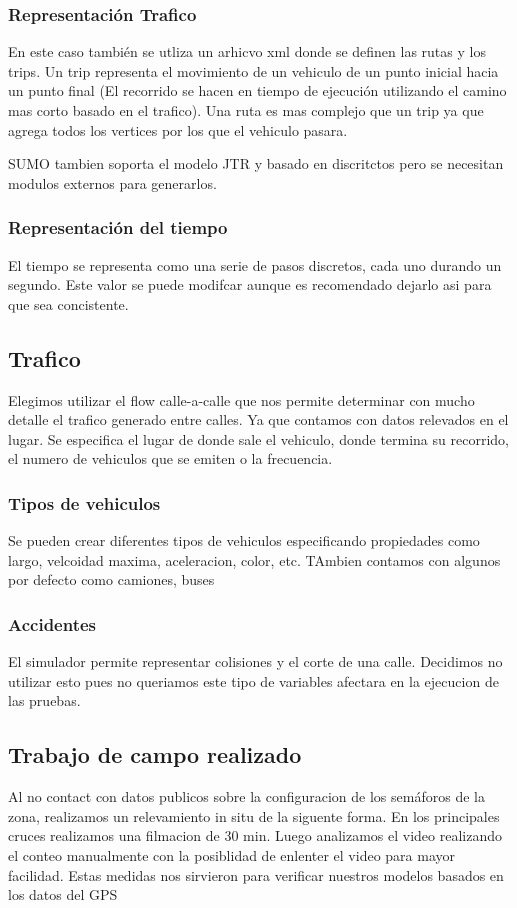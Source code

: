 \subsubsection{Representación Trafico}
En este caso también se utliza un arhicvo xml donde se definen las rutas y los trips. Un trip representa el movimiento de un vehiculo de un punto inicial hacia un punto final (El recorrido se hacen en tiempo de ejecución utilizando el camino mas corto basado en el trafico). Una ruta es mas complejo que un trip ya que agrega todos los vertices por los que el vehiculo pasara.

SUMO tambien soporta el modelo JTR y basado en discritctos pero se necesitan modulos externos para generarlos.

\subsubsection{Representación del tiempo}
El tiempo se representa como una serie de pasos discretos, cada uno durando un segundo. Este valor se puede modifcar aunque es recomendado dejarlo asi para que sea concistente.

\subsection{Trafico}
Elegimos utilizar el flow calle-a-calle que nos permite determinar con mucho detalle el trafico generado entre calles. Ya que contamos con datos relevados en el lugar. Se especifica el lugar de donde sale el vehiculo, donde termina su recorrido, el numero de vehiculos que se emiten o la frecuencia.

\subsubsection{Tipos de vehiculos}
Se pueden crear diferentes tipos de vehiculos especificando propiedades como largo, velcoidad maxima,  aceleracion, color, etc. TAmbien contamos con algunos por defecto como camiones, buses

\subsubsection{Accidentes}
El simulador permite representar colisiones y el corte de una calle. Decidimos no utilizar esto pues no queriamos este tipo de variables afectara en la ejecucion de las pruebas.

\subsection{Trabajo de campo realizado}
Al no contact con datos publicos sobre la configuracion de los semáforos de la zona, realizamos un relevamiento in situ de la siguente forma.
En los principales cruces realizamos una filmacion de 30 min. Luego analizamos el video realizando el conteo manualmente con la posiblidad de enlenter el video para mayor facilidad.
Estas medidas nos sirvieron para verificar nuestros modelos basados en los datos del GPS 

